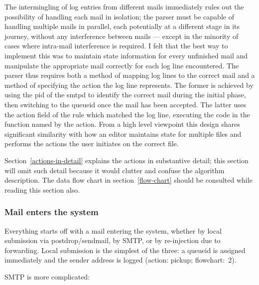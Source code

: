 \documentclass[a4paper,12pt,draft]{article}
\begin{document}
The intermingling of log entries from different mails immediately rules out
the possibility of handling each mail in isolation; the parser must be
capable of handling multiple mails in parallel, each potentially at a
different stage in its journey, without any interference between mails ---
except in the minority of cases where intra-mail interference is required.
I felt that the best way to implement this was to maintain state
information for every unfinished mail and manipulate the appropriate mail
correctly for each log line encountered.  The parser thus requires both a
method of mapping log lines to the correct mail and a method of specifying
the action the log line represents.  The former is achieved by using the
pid of the smtpd to identify the correct mail during the initial phase,
then switching to the queueid once the mail has been accepted.  The latter
uses the action field of the rule which matched the log line, executing the
code in the function named by the action.  From a high level viewpoint this
design shares significant similarity with how an editor maintains state for
multiple files and performs the actions the user initiates on the correct
file.

Section~\ref{actions-in-detail} explains the actions in substantive detail;
this section will omit such detail because it would clutter and confuse the
algorithm description.  The data flow chart in section~\ref{flow-chart}
should be consulted while reading this section also.

\subsubsection{Mail enters the system}

\label{mail-enters-the-system}

Everything starts off with a mail entering the system, whether by local
submission via postdrop/sendmail, by SMTP, or by re-injection due to
forwarding.  Local submission is the simplest of the three: a queueid is
assigned immediately and the sender address is logged (action: pickup;
flowchart:~2).

SMTP is more complicated: 
\end{document}
